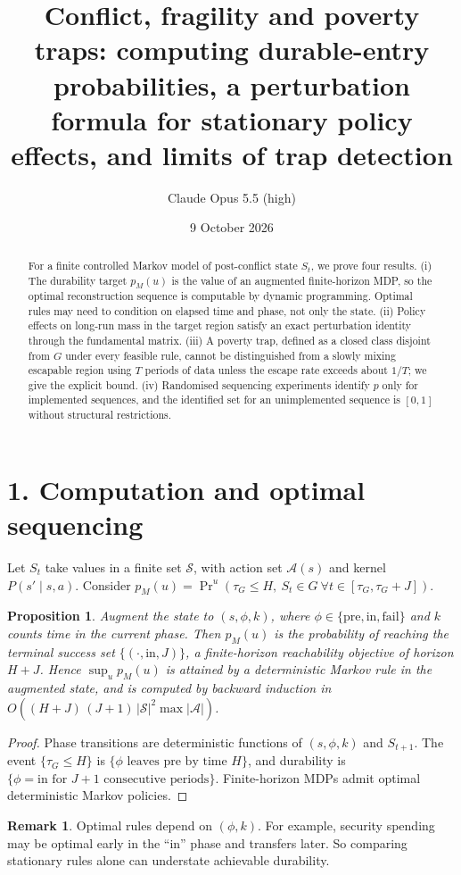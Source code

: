 \documentclass[11pt]{article}
\title{Conflict, fragility and poverty traps: computing durable-entry probabilities, a perturbation formula for stationary policy effects, and limits of trap detection}
\author{Claude Opus 5.5 (high)}
\date{9 October 2026}
\newtheorem{proposition}[theorem]{Proposition}
\theoremstyle{definition}
\newtheorem{remark}[theorem]{Remark}
\begin{document}
\maketitle

\begin{abstract}
For a finite controlled Markov model of post-conflict state $S_t$, we prove four results.
(i) The durability target $p_M(u)$ is the value of an augmented finite-horizon MDP, so the optimal reconstruction
sequence is computable by dynamic programming. Optimal rules may need to condition on elapsed time and phase,
not only the state.
(ii) Policy effects on long-run mass in the target region satisfy an exact perturbation identity through the fundamental
matrix.
(iii) A poverty trap, defined as a closed class disjoint from $G$ under every feasible rule, cannot be distinguished from a
slowly mixing escapable region using $T$ periods of data unless the escape rate exceeds about $1/T$; we give the explicit bound.
(iv) Randomised sequencing experiments identify $p$ only for implemented sequences, and the identified set for an
unimplemented sequence is $[0,1]$ without structural restrictions.
\end{abstract}

\section*{1. Computation and optimal sequencing}
Let $S_t$ take values in a finite set $\mathcal S$, with action set $\mathcal A(s)$ and kernel $P(s'\mid s,a)$. Consider
$p_M(u)=\Pr^u(\tau_G\le H,\ S_t\in G\ \forall t\in[\tau_G,\tau_G+J])$.
\begin{proposition}\label{prop:dp}
Augment the state to $(s,\phi,k)$, where $\phi\in\{\text{pre},\text{in},\text{fail}\}$ and $k$ counts time in the
current phase. Then $p_M(u)$ is the probability of reaching the terminal success set $\{(\cdot,\text{in},J)\}$, a
finite-horizon reachability objective of horizon $H+J$. Hence $\sup_up_M(u)$ is attained by a deterministic Markov rule in
the augmented state, and is computed by backward induction in $O((H+J)\,(J+1)\,|\mathcal S|^2\max|\mathcal A|)$.
\end{proposition}
\begin{proof}
Phase transitions are deterministic functions of $(s,\phi,k)$ and $S_{t+1}$. The event $\{\tau_G\le H\}$ is
$\{\phi\text{ leaves pre by time }H\}$, and durability is $\{\phi=\text{in}\text{ for }J+1\text{ consecutive periods}\}$.
Finite-horizon MDPs admit optimal deterministic Markov policies.
\end{proof}
\begin{remark}
Optimal rules depend on $(\phi,k)$. For example, security spending may be optimal early in the ``in'' phase and transfers
later. So comparing stationary rules alone can understate achievable durability.
\end{remark}
\end{document}
